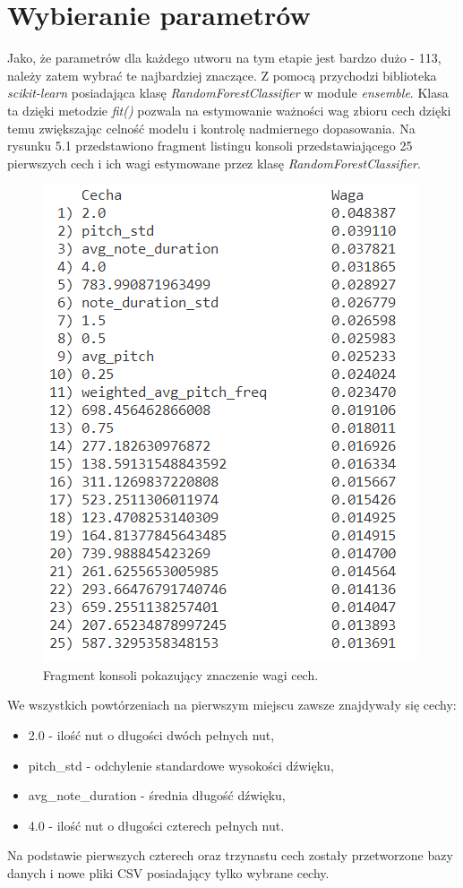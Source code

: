 \documentclass[printmode, eng, openany]{mgr}
\newcommand\tab[1][1cm]{\hspace*{#1}}
\begin{document}
\section{Wybieranie parametrów}
\tab Jako, że parametrów dla każdego utworu na tym etapie jest bardzo dużo -  113, należy zatem wybrać te najbardziej znaczące. Z pomocą przychodzi biblioteka \textit{scikit-learn} posiadająca klasę \textit{RandomForestClassifier} w module \textit{ensemble}. Klasa ta dzięki metodzie \textit{fit()} pozwala na estymowanie ważności wag zbioru cech dzięki temu zwiększając celność modelu i kontrolę nadmiernego dopasowania. Na rysunku 5.1 przedstawiono fragment listingu konsoli przedstawiającego 25 pierwszych cech i ich wagi estymowane przez klasę \textit{RandomForestClassifier}.\\
\begin{figure}[!htb]
\centering
\includegraphics{wagi}
\caption{Fragment konsoli pokazujący znaczenie wagi cech.}
\end{figure}
\tab We wszystkich powtórzeniach na pierwszym miejscu zawsze znajdywały się cechy: 
\begin{itemize}
\item 2.0 - ilość nut o długości dwóch pełnych nut,
\item pitch\_std - odchylenie standardowe wysokości dźwięku,
\item avg\_note\_duration - średnia długość dźwięku,
\item 4.0 - ilość nut o długości czterech pełnych nut.
\end{itemize}
\tab Na podstawie pierwszych czterech oraz trzynastu cech zostały przetworzone bazy danych i nowe pliki CSV posiadający tylko wybrane cechy.\newpage
\end{document}
